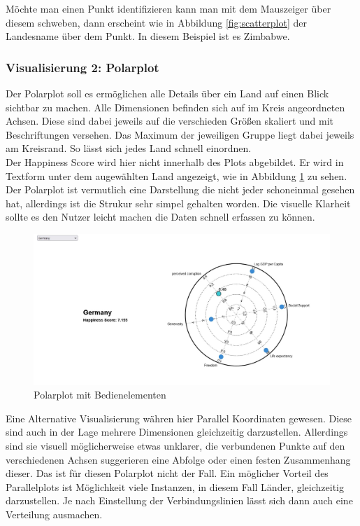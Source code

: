 Möchte man einen Punkt identifizieren kann man mit dem Mauszeiger über diesem schweben, dann erscheint wie in Abbildung \ref{fig:scatterplot} der Landesname über dem Punkt. In diesem Beispiel ist es Zimbabwe. 


\subsubsection{Visualisierung 2: Polarplot}

Der Polarplot soll es ermöglichen alle Details über ein Land auf einen Blick sichtbar zu machen. Alle Dimensionen befinden sich auf im Kreis angeordneten Achsen. Diese sind dabei jeweils auf die verschieden Größen skaliert und mit Beschriftungen versehen. Das Maximum der jeweiligen Gruppe liegt dabei jeweils am Kreisrand. So lässt sich jedes Land schnell einordnen. \\

Der Happiness Score wird hier nicht innerhalb des Plots abgebildet. Er wird in Textform unter dem augewählten Land angezeigt, wie in Abbildung \ref{fig:polarplot} zu sehen. Der Polarplot ist vermutlich eine Darstellung die nicht jeder schoneinmal gesehen hat, allerdings ist die Strukur sehr simpel gehalten worden. Die visuelle Klarheit sollte es den Nutzer leicht machen die Daten schnell erfassen zu können. \\

\begin{figure}[h]
 \centering
 \includegraphics[width = \textwidth]{img/polarplot.jpg}
 \caption{Polarplot mit Bedienelementen}
 \label{fig:polarplot}
\end{figure}


Eine Alternative Visualisierung währen hier Parallel Koordinaten gewesen. Diese sind auch in der Lage mehrere Dimensionen gleichzeitig darzustellen. Allerdings sind sie visuell möglicherweise etwas unklarer, die verbundenen Punkte auf den verschiedenen Achsen suggerieren eine Abfolge oder einen festen Zusammenhang dieser. Das ist für diesen Polarplot nicht der Fall. Ein möglicher Vorteil des Parallelplots ist Möglichkeit viele Instanzen, in diesem Fall Länder, gleichzeitig darzustellen. Je nach Einstellung der Verbindungslinien lässt sich dann auch eine Verteilung ausmachen. 

